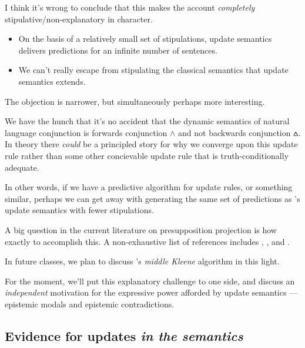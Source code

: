 \documentclass[nols,twoside,nofonts,nobib,nohyper]{tufte-handout}
\theoremstyle{definition}
\begin{document}
I think it's wrong to conclude that this makes the account \textit{completely} stipulative/non-explanatory in character.

\begin{itemize}

    \item On the basis of a relatively small set of stipulations, update semantics delivers predictions for an infinite number of sentences.

    \item We can't really escape from stipulating the classical semantics that update semantics extends.

\end{itemize}

The objection is narrower, but simultaneously perhaps more interesting.

We have the hunch that it's no accident that the dynamic semantics of natural language conjunction is forwards conjunction $∧$ and not backwards conjunction $\wedgebar$. In theory there \textit{could} be a principled story for why we converge upon this update rule rather than some other concievable update rule that is truth-conditionally adequate.

In other words, if we have a predictive algorithm for update rules, or something similar, perhaps we can get away with generating the same set of predictions as \citeauthor{Heim1983}'s update semantics with fewer stipulations.

A big question in the current literature on presupposition projection is how exactly to accomplish this. A non-exhaustive list of references includes \cite{George2007,George2008,George2014}, \cite{Schlenker2008,Schlenker2009,Schlenker2010}, and \cite{Fox2013}.

In future classes, we plan to discuss \citeauthor{George2007}'s \textit{middle Kleene} algorithm in this light.

For the moment, we'll put this explanatory challenge to one side, and discuss an \textit{independent} motivation for the expressive power afforded by update semantics --- epistemic modals and epistemic contradictions.

\subsection{Evidence for updates \textit{in the semantics}}
\end{document}

